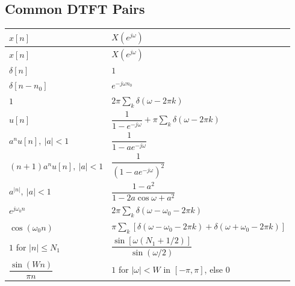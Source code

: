\documentclass[10pt]{article}
\begin{document}
\subsection{Common DTFT Pairs}
\begin{longtable}{@{}ll@{}}
\toprule $x[n]$ & $X(e^{j\omega})$ \\ \midrule \endfirsthead
\toprule $x[n]$ & $X(e^{j\omega})$ \\ \midrule \endhead
\bottomrule \endfoot
$\delta[n]$ & $1$ \\
$\delta[n - n_0]$ & $e^{-j\omega n_0}$ \\
$1$ & $2\pi\sum_k \delta(\omega - 2\pi k)$ \\
$u[n]$ & $\dfrac{1}{1 - e^{-j\omega}} + \pi\sum_k\delta(\omega - 2\pi k)$ \\
$a^n u[n],\ |a|<1$ & $\dfrac{1}{1 - a e^{-j\omega}}$ \\
$(n+1)a^n u[n],\ |a|<1$ & $\dfrac{1}{(1 - a e^{-j\omega})^2}$ \\
$a^{|n|},\ |a|<1$ & $\dfrac{1 - a^2}{1 - 2a\cos\omega + a^2}$ \\
$e^{j\omega_0 n}$ & $2\pi\sum_k \delta(\omega - \omega_0 - 2\pi k)$ \\
$\cos(\omega_0 n)$ & $\pi\sum_k[\delta(\omega - \omega_0 - 2\pi k) + \delta(\omega + \omega_0 - 2\pi k)]$ \\
$1$ for $|n|\le N_1$ & $\dfrac{\sin[\omega(N_1 + 1/2)]}{\sin(\omega/2)}$ \\
$\dfrac{\sin(Wn)}{\pi n}$ & $1$ for $|\omega|<W$ in $[-\pi,\pi]$, else $0$ \\
\end{longtable}
\end{document}
